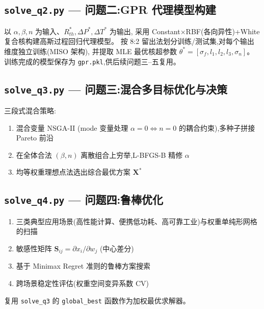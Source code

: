 

\newpage
\subsection{\texttt{solve\_q2.py} — 问题二:GPR 代理模型构建}

以 $\alpha,\beta,n$ 为输入、$R_{th}^*,\Delta P^*,\Delta T^*$ 为输出,
采用 Constant$\times$RBF(各向异性)+White 复合核构建高斯过程回归代理模型。
按 8:2 留出法划分训练/测试集,对每个输出维度独立训练(MISO 架构),
并提取 MLE 最优核超参数 $\theta^*=[\sigma_f,l_1,l_2,l_3,\sigma_n]$。
训练完成的模型保存为 \texttt{gpr.pkl},供后续问题三--五复用。



\newpage
\subsection{\texttt{solve\_q3.py} — 问题三:混合多目标优化与决策}

三段式混合策略:
\begin{enumerate}[label=(\arabic*)]
    \item 混合变量 NSGA-II (mode 变量处理 $\alpha=0\Leftrightarrow n=0$ 的耦合约束),多种子拼接 Pareto 前沿
    \item 在全体合法 $(\beta,n)$ 离散组合上穷举,L-BFGS-B 精修 $\alpha$
    \item 均等权重理想点法选出综合最优方案 $\mathbf{X}^*$
\end{enumerate}



\newpage
\subsection{\texttt{solve\_q4.py} — 问题四:鲁棒优化}

\begin{enumerate}[label=(\arabic*)]
    \item 三类典型应用场景(高性能计算、便携低功耗、高可靠工业)与权重单纯形网格的扫描
    \item 敏感性矩阵 $\mathbf{S}_{ij}=\partial x_i/\partial w_j$ (中心差分)
    \item 基于 Minimax Regret 准则的鲁棒方案搜索
    \item 跨场景稳定性评估(权重空间变异系数 CV)
\end{enumerate}
复用 \texttt{solve\_q3} 的 \texttt{global\_best} 函数作为加权最优求解器。

